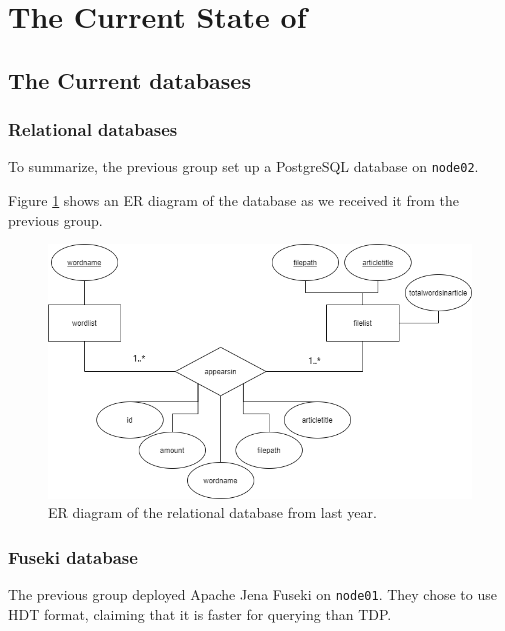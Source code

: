 \section{The Current State of \knox{}} \label{currentState}





\subsection{The Current \knox{} databases}
\subsubsection*{Relational databases}
To summarize, the previous group set up a PostgreSQL database on \texttt{node02}.

Figure \ref{olddatabase} shows an ER diagram of the database as we received it from the previous group.

\begin{figure}[h]
    \centering
    \includegraphics[width=\linewidth]{Images/old_db_er_diagram.png}
    \caption{ER diagram of the relational database from last year.}
    \label{olddatabase}
\end{figure}

\subsubsection*{Fuseki database}
The previous group deployed Apache Jena Fuseki on \texttt{node01}. They chose to use HDT format, claiming that it is faster for querying than TDP\cite{knox2020}.

